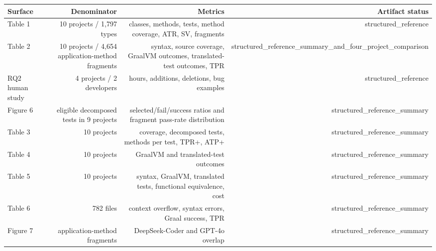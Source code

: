 \documentclass{article}
\begin{document}
\begin{tabular}{lrrr}
\toprule
Surface & Denominator & Metrics & Artifact status \\
\midrule
Table 1 & 10 projects / 1,797 types & classes, methods, tests, method coverage, ATR, SV, fragments & structured\_reference \\
Table 2 & 10 projects / 4,654 application-method fragments & syntax, source coverage, GraalVM outcomes, translated-test outcomes, TPR & structured\_reference\_summary\_and\_four\_project\_comparison \\
RQ2 human study & 4 projects / 2 developers & hours, additions, deletions, bug examples & structured\_reference \\
Figure 6 & eligible decomposed tests in 9 projects & selected/fail/success ratios and fragment pass-rate distribution & structured\_reference\_summary \\
Table 3 & 10 projects & coverage, decomposed tests, methods per test, TPR+, ATP+ & structured\_reference\_summary \\
Table 4 & 10 projects & GraalVM and translated-test outcomes & structured\_reference\_summary \\
Table 5 & 10 projects & syntax, GraalVM, translated tests, functional equivalence, cost & structured\_reference\_summary \\
Table 6 & 782 files & context overflow, syntax errors, Graal success, TPR & structured\_reference\_summary \\
Figure 7 & application-method fragments & DeepSeek-Coder and GPT-4o overlap & structured\_reference\_summary \\
\bottomrule
\end{tabular}
\end{document}
